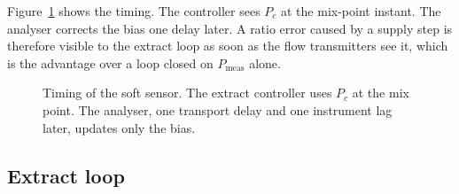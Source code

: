 Figure~\ref{fig:soft} shows the timing. The controller sees $P_c$ at the mix-point instant. The analyser corrects the bias one delay later. A ratio error caused by a supply step is therefore visible to the extract loop as soon as the flow transmitters see it, which is the advantage over a loop closed on $P_{\mathrm{meas}}$ alone.

\begin{figure}[htbp]
\centering
{}
\caption{Timing of the soft sensor. The extract controller uses $P_c$ at the mix point. The analyser, one transport delay and one instrument lag later, updates only the bias.}
\label{fig:soft}
\end{figure}

\subsection{Extract loop}

